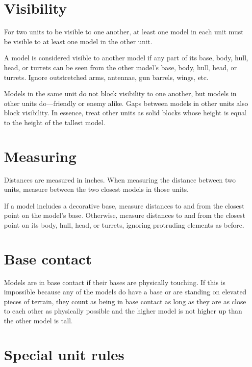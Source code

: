 \begin{multicols}{2}
\section*{Visibility}

For two units to be visible to one another, at least one model in each unit must be visible to at least one model in the other unit.

A model is considered visible to another model if any part of its base, body, hull, head, or turrets can be seen from the other model's base, body, hull, head, or turrets. Ignore outstretched arms, antennae, gun barrels, wings, etc.

Models in the same unit do not block visibility to one another, but models in other units do—friendly or enemy alike. Gaps between models in other units also block visibility. In essence, treat other units as solid blocks whose height is equal to the height of the tallest model.




\section*{Measuring}

Distances are measured in inches. When measuring the distance between two units, measure between the two closest models in those units.

If a model includes a decorative base, measure distances to and from the closest point on the model's base. Otherwise, measure distances to and from the closest point on its body, hull, head, or turrets, ignoring protruding elements as before.






\section*{Base contact}

Models are in base contact if their bases are physically touching. If this is impossible because any of the models do have a base or are standing on elevated pieces of terrain, they count as being in base contact as long as they are as close to each other as physically possible and the higher model is not higher up than the other model is tall.




\section*{Special unit rules}


\end{multicols}
